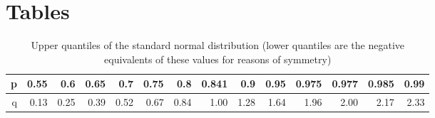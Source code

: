 \chapter{Tables}
\label{ch:tables}

\begin{table}[ht]
\centering
\begin{tabular}{rrrrrrrrrrrrrr}
  \hline
 p & 0.55 & 0.6 & 0.65 & 0.7 & 0.75 & 0.8 & 0.841 & 0.9 & 0.95 & 0.975 & 0.977 & 0.985 & 0.99 \\ 
  \hline
 q & 0.13 & 0.25 & 0.39 & 0.52 & 0.67 & 0.84 & 1.00 & 1.28 & 1.64 & 1.96 & 2.00 & 2.17 & 2.33 \\ 
   \hline
\end{tabular}
\caption{Upper quantiles of the standard normal distribution (lower quantiles are the negative equivalents of these values for reasons of symmetry)}
\label{tab:normal}
\end{table}

